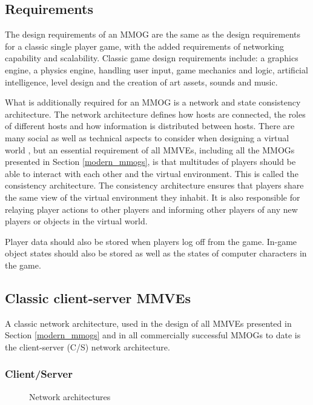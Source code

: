 \subsection{Requirements}

The design requirements of an MMOG are the same as the design requirements for a classic single player game, with the added requirements of networking capability and scalability. Classic game design requirements include: a graphics engine, a physics engine, handling user input, game mechanics and logic, artificial intelligence, level design and the creation of art assets, sounds and music.

What is additionally required for an MMOG is a network and state consistency architecture. The network architecture defines how hosts are connected, the roles of different hosts and how information is distributed between hosts. There are many social as well as technical aspects to consider when designing a virtual world \cite{designing_virtual_worlds}, but an essential requirement of all MMVEs, including all the MMOGs presented in Section \ref{modern_mmogs}, is that multitudes of players should be able to interact with each other and the virtual environment. This is called the consistency architecture. The consistency architecture ensures that players share the same view of the virtual environment they inhabit. It is also responsible for relaying player actions to other players and informing other players of any new players or objects in the virtual world.

Player data should also be stored when players log off from the game. In-game object states should also be stored as well as the states of computer characters in the game.

\subsection{Classic client-server MMVEs}

A classic network architecture, used in the design of all MMVEs presented in Section \ref{modern_mmogs} and in all commercially successful MMOGs to date is the client-server (C/S) network architecture.

\subsubsection{Client/Server}
\label{client_server_network_model}

\begin{figure}[htbp]
\centering
\caption{Network architectures}
\end{figure}

